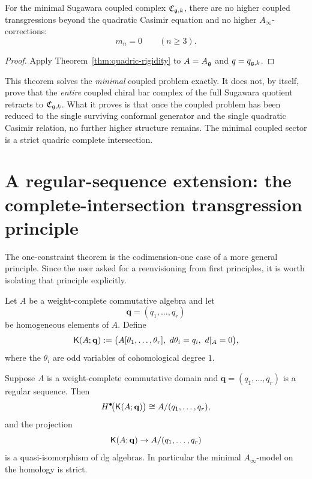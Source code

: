\begin{corollary}
For the minimal Sugawara coupled complex \(\mathfrak C_{\mathfrak g,k}\), there are no higher coupled transgressions beyond the quadratic Casimir equation and no higher \(A_\infty\)-corrections:
\[
m_n=0\qquad(n\ge 3).
\]
\end{corollary}

\begin{proof}
Apply Theorem~\ref{thm:quadric-rigidity} to \(A=A_{\mathfrak g}\) and \(q=q_{\mathfrak g,k}\).
\end{proof}

\begin{remark}
This theorem solves the \emph{minimal} coupled problem exactly. It does not, by itself, prove that the \emph{entire} coupled chiral bar complex of the full Sugawara quotient retracts to \(\mathfrak C_{\mathfrak g,k}\). What it proves is that once the coupled problem has been reduced to the single surviving conformal generator and the single quadratic Casimir relation, no further higher structure remains. The minimal coupled sector is a strict quadric complete intersection.
\end{remark}

\section{A regular-sequence extension: the complete-intersection transgression principle}

The one-constraint theorem is the codimension-one case of a more general principle. Since the user asked for a reenvisioning from first principles, it is worth isolating that principle explicitly.

\begin{definition}
Let \(A\) be a weight-complete commutative algebra and let
\[
\mathbf q=(q_1,\dots,q_r)
\]
be homogeneous elements of \(A\). Define
\[
\Kcpx(A;\mathbf q):=
\bigl(A[\theta_1,\dots,\theta_r],\ d\theta_i=q_i,\ d|_A=0\bigr),
\]
where the \(\theta_i\) are odd variables of cohomological degree \(1\).
\end{definition}

\begin{theorem}\label{thm:ci}
Suppose \(A\) is a weight-complete commutative domain and \(\mathbf q=(q_1,\dots,q_r)\) is a regular sequence. Then
\[
H^\bullet\!\bigl(\mathsf K(A;\mathbf q)\bigr)\cong A/(q_1,\dots,q_r),
\]
and the projection
\[
\mathsf K(A;\mathbf q)\to A/(q_1,\dots,q_r)
\]
is a quasi-isomorphism of dg algebras. In particular the minimal \(A_\infty\)-model on the homology is strict.
\end{theorem}

